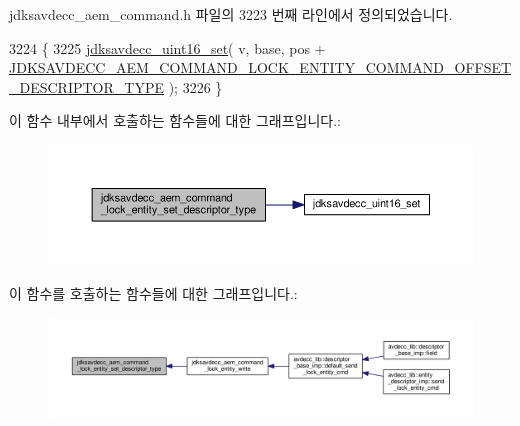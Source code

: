 jdksavdecc\+\_\+aem\+\_\+command.\+h 파일의 3223 번째 라인에서 정의되었습니다.


\begin{DoxyCode}
3224 \{
3225     \hyperlink{group__endian_ga14b9eeadc05f94334096c127c955a60b}{jdksavdecc\_uint16\_set}( v, base, pos + 
      \hyperlink{group__command__lock__entity_ga6f928332cad3c37d4fa173ec3f958e1d}{JDKSAVDECC\_AEM\_COMMAND\_LOCK\_ENTITY\_COMMAND\_OFFSET\_DESCRIPTOR\_TYPE}
       );
3226 \}
\end{DoxyCode}


이 함수 내부에서 호출하는 함수들에 대한 그래프입니다.\+:
\nopagebreak
\begin{figure}[H]
\begin{center}
\leavevmode
\includegraphics[width=350pt]{group__command__lock__entity_ga403a35e4062fd1a0a55169292f5bffe3_cgraph}
\end{center}
\end{figure}




이 함수를 호출하는 함수들에 대한 그래프입니다.\+:
\nopagebreak
\begin{figure}[H]
\begin{center}
\leavevmode
\includegraphics[width=350pt]{group__command__lock__entity_ga403a35e4062fd1a0a55169292f5bffe3_icgraph}
\end{center}
\end{figure}


